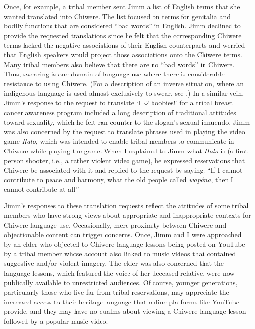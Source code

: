 \documentclass[output=paper]{LSP/langsci}
\begin{document}
Once, for example, a tribal member sent Jimm a list of English terms that she wanted translated into Chiwere. The list focused on terms for genitalia and bodily functions that are considered ``bad words'' in English. Jimm declined to provide the requested translations since he felt that the corresponding Chiwere terms lacked the negative associations of their English counterparts and worried that English speakers would project those associations onto the Chiwere terms. Many tribal members also believe that there are no ``bad words'' in Chiwere. Thus, swearing is one domain of language use where there is considerable resistance to using Chiwere. (For a description of an inverse situation, where an indigenous language is used almost exclusively to swear, see \citealt{Muehlmann2008}.) In a similar vein, Jimm's response to the request to translate `I $\heartsuit$ boobies!' for a tribal breast cancer awareness program included a long description of traditional attitudes toward sexuality, which he felt ran counter to the slogan's sexual innuendo. Jimm was also concerned by the request to translate phrases used in playing the video game \emph{Halo}, which was intended to enable tribal members to communicate in Chiwere while playing the game. When I explained to Jimm what \emph{Halo} is (a first-person shooter, i.e., a rather violent video game), he expressed reservations that Chiwere be associated with it and replied to the request by saying: ``If I cannot contribute to peace and harmony, what the old people called \emph{wapána}, then I cannot contribute at all.''

Jimm's responses to these translation requests reflect the attitudes of some tribal members who have strong views about appropriate and inappropriate contexts for Chiwere language use. Occasionally, mere proximity between Chiwere and objectionable content can trigger concerns. Once, Jimm and I were approached by an elder who objected to Chiwere language lessons being posted on YouTube by a tribal member whose account also linked to music videos that contained suggestive and/or violent imagery. The elder was also concerned that the language lessons, which featured the voice of her deceased relative, were now publically available to unrestricted audiences. Of course, younger generations, particularly those who live far from tribal reservations, may appreciate the increased access to their heritage language that online platforms like YouTube provide, and they may have no qualms about viewing a Chiwere language lesson followed by a popular music video.
\end{document}
